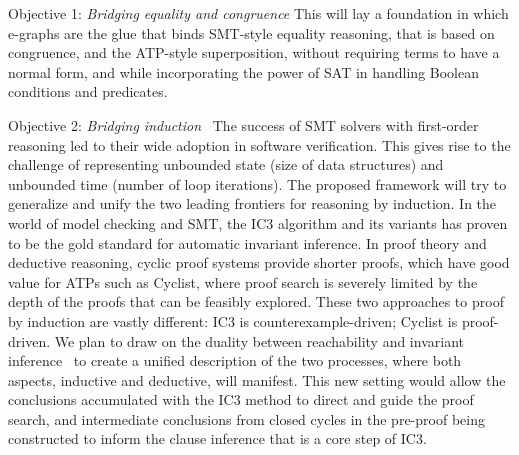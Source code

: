 \begin{paragraph}{Objective 1: {\it Bridging equality and congruence}}
This will lay a foundation in which e-graphs are the glue that binds SMT-style equality reasoning, that is based on congruence, and the ATP-style superposition, without requiring terms to have a normal form, and while incorporating the power of SAT in handling Boolean conditions and predicates.
\end{paragraph}

\begin{paragraph}{Objective 2: {\it Bridging induction}}~
The success of SMT solvers with first-order reasoning led to their wide adoption in software verification.
This gives rise to the challenge of representing unbounded state (\eg size of data structures) and unbounded time (\eg number of loop iterations).
The proposed framework will try to generalize and unify the two leading frontiers for reasoning by induction.
In the world of model checking and SMT, the IC3 algorithm and its variants %
has proven to be the gold standard for automatic invariant inference.
In proof theory and deductive reasoning, cyclic proof systems provide shorter proofs, which have good value for ATPs such as Cyclist, where proof search is severely limited by the depth of the proofs that can be feasibly explored.
These two approaches to proof by induction are vastly different: IC3 is counterexample-driven; Cyclist is proof-driven.
We plan to draw on the duality between reachability and invariant inference~\cite{arXiv2020:Padon} to create a unified description of the two processes, where both aspects, inductive and deductive, will manifest.
This new setting would allow the conclusions accumulated with the IC3 method to direct and guide the proof search, and intermediate conclusions from closed cycles in the pre-proof being constructed to inform the clause inference that is a core step of IC3.


\end{paragraph}
